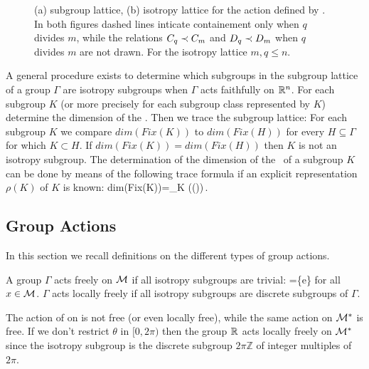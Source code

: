 \begin{example}
\begin{figure}
\begin{center}
\end{center}
\caption[O(2) lattices]{
    {\small
    (a)  subgroup lattice, (b)  isotropy lattice for the action
	defined by . In both figures dashed lines inticate
	containement only when $q$ divides $m$, while the relations $C_{q}\prec C_{m}$
	and $D_{q}\prec D_{m}$ when $q$ divides $m$ are not drawn. For the isotropy lattice $m,q\le n$.
	}}
\label{fig:O2lattice}
    \vspace*{-5pt}
\end{figure}

\end{example}

A general procedure exists \cite{gatermannHab} to determine which subgroups in the subgroup lattice of a group $\Gamma$ are isotropy
subgroups when $\Gamma$ acts faithfully on $\mathbb{R}^{n}$.
For each subgroup $K$ (or more precisely for each subgroup class represented by $K$)
determine the dimension of the \fixedsp. Then we trace the subgroup lattice: For each subgroup
$K$ we compare $dim(Fix(K))$ to $dim(Fix(H))$ for every $H\subseteq\Gamma$ for which $K\subset H$.
If  $dim(Fix(K))=dim(Fix(H))$ then $K$ is not an isotropy subgroup. The determination of the dimension of the
\fixedsp\ of a subgroup $K$ can be done by means of the following trace formula if an explicit representation
$\rho(K)$ of $K$ is known:
\beq
	dim(Fix(K))=\sum_{\kappa\in K} \trace(\rho(\kappa))\,.
\eeq

\subsection{Group Actions}

In this section we recall definitions on the different types of group actions. 

\begin{definition}
\label{def:free}
A group $\Gamma$ acts freely on $\mathcal{M}$ if all isotropy subgroups are trivial: =\{e\} for all $x\in \mathcal{M}$.
$\Gamma$ acts locally freely if all isotropy subgroups are discrete subgroups of $\Gamma$.
\end{definition}

\begin{example}
The action  of  on  is not free (or even locally free), while the same action on $\mathcal{M}^*$ is free. If we don't
restrict $\theta$ in $[0,2\pi)$ then the group $\mathbb{R}^{}$ acts locally freely on $\mathcal{M}^*$
since the isotropy subgroup is the discrete subgroup $2\pi\mathbb{Z}$ of integer multiples of $2\pi$.
\end{example}

